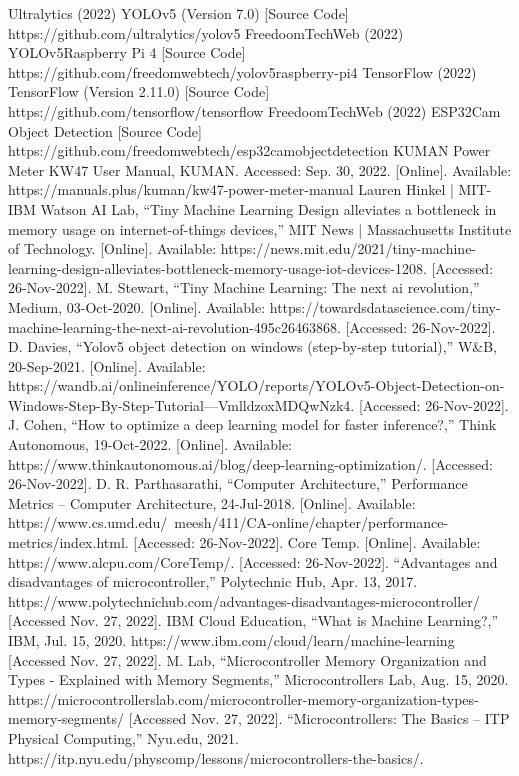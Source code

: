 \documentclass[Report]{IEEEtran}
\begin{document}
\begin{thebibliography}{00}
 Ultralytics (2022) YOLOv5 (Version 7.0) [Source Code] https://github.com/ultralytics/yolov5
 FreedoomTechWeb (2022) YOLOv5Raspberry Pi 4 [Source Code] https://github.com/freedomwebtech/yolov5raspberry-pi4
 TensorFlow (2022) TensorFlow (Version 2.11.0) [Source Code] https://github.com/tensorflow/tensorflow
 FreedoomTechWeb (2022) ESP32Cam Object Detection [Source Code] https://github.com/freedomwebtech/esp32camobjectdetection
 KUMAN Power Meter KW47
User Manual, KUMAN. Accessed: Sep. 30, 2022. [Online]. Available: https://manuals.plus/kuman/kw47-power-meter-manual
 Lauren Hinkel  |  MIT-IBM Watson AI Lab, “Tiny Machine Learning Design alleviates a bottleneck in memory usage on internet-of-things devices,” MIT News | Massachusetts Institute of Technology. [Online]. Available: https://news.mit.edu/2021/tiny-machine-learning-design-alleviates-bottleneck-memory-usage-iot-devices-1208. [Accessed: 26-Nov-2022].
 M. Stewart, “Tiny Machine Learning: The next ai revolution,” Medium, 03-Oct-2020. [Online]. Available: https://towardsdatascience.com/tiny-machine-learning-the-next-ai-revolution-495c26463868. [Accessed: 26-Nov-2022]. 
 D. Davies, “Yolov5 object detection on windows (step-by-step tutorial),” W\&B, 20-Sep-2021. [Online]. Available: https://wandb.ai/onlineinference/YOLO/reports/YOLOv5-Object-Detection-on-Windows-Step-By-Step-Tutorial---VmlldzoxMDQwNzk4. [Accessed: 26-Nov-2022]. 
 J. Cohen, “How to optimize a deep learning model for faster inference?,” Think Autonomous, 19-Oct-2022. [Online]. Available: https://www.thinkautonomous.ai/blog/deep-learning-optimization/. [Accessed: 26-Nov-2022]. 
 D. R. Parthasarathi, “Computer Architecture,” Performance Metrics – Computer Architecture, 24-Jul-2018. [Online]. Available: https://www.cs.umd.edu/~meesh/411/CA-online/chapter/performance-metrics/index.html. [Accessed: 26-Nov-2022]. 
 Core Temp. [Online]. Available: https://www.alcpu.com/CoreTemp/. [Accessed: 26-Nov-2022]. 
 “Advantages and disadvantages of microcontroller,” Polytechnic Hub, Apr. 13, 2017. https://www.polytechnichub.com/advantages-disadvantages-microcontroller/ [Accessed Nov. 27, 2022].
 IBM Cloud Education, “What is Machine Learning?,” IBM, Jul. 15, 2020. https://www.ibm.com/cloud/learn/machine-learning [Accessed Nov. 27, 2022].
 M. Lab, “Microcontroller Memory Organization and Types - Explained with Memory Segments,” Microcontrollers Lab, Aug. 15, 2020. https://microcontrollerslab.com/microcontroller-memory-organization-types-memory-segments/ [Accessed Nov. 27, 2022].
 “Microcontrollers: The Basics – ITP Physical Computing,” Nyu.edu, 2021. https://itp.nyu.edu/physcomp/lessons/microcontrollers-the-basics/.
\end{thebibliography}
\vspace{12pt}
\end{document}

